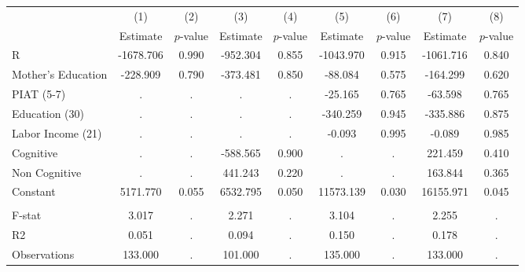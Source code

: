 \begin{tabular}{lcccccccc} \toprule
 & (1) & (2) & (3) & (4) & (5) & (6) & (7) & (8) \\ 
 & Estimate  & $p$-value  & Estimate  & $p$-value  & Estimate  & $p$-value  & Estimate  & $p$-value  \\  \midrule
R & -1678.706 &     0.990 &  -952.304 &     0.855 & -1043.970 &     0.915 & -1061.716 &     0.840 \\  
Mother's Education &  -228.909 &     0.790 &  -373.481 &     0.850 &   -88.084 &     0.575 &  -164.299 &     0.620 \\  
PIAT (5-7) &         . &         . &         . &         . &   -25.165 &     0.765 &   -63.598 &     0.765 \\  
Education (30) &         . &         . &         . &         . &  -340.259 &     0.945 &  -335.886 &     0.875 \\  
Labor Income (21) &         . &         . &         . &         . &    -0.093 &     0.995 &    -0.089 &     0.985 \\  
Cognitive &         . &         . &  -588.565 &     0.900 &         . &         . &   221.459 &     0.410 \\  
Non Cognitive &         . &         . &   441.243 &     0.220 &         . &         . &   163.844 &     0.365 \\  
Constant &  5171.770 &     0.055 &  6532.795 &     0.050 & 11573.139 &     0.030 & 16155.971 &     0.045 \\  \\ \midrule
F-stat &     3.017 &         . &     2.271 &         . &     3.104 &         . &     2.255 &         . \\  
R2 &     0.051 &         . &     0.094 &         . &     0.150 &         . &     0.178 &         . \\  
Observations &   133.000 &         . &   101.000 &         . &   135.000 &         . &   133.000 &         . \\  
\bottomrule \end{tabular}